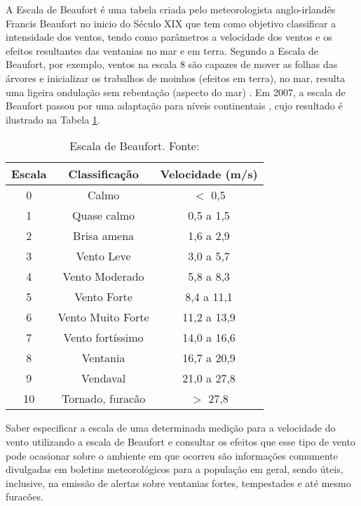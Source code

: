 A Escala de Beaufort é uma tabela criada pelo meteorologista anglo-irlandês Francis Beaufort no inicio do Século XIX que tem como objetivo classificar a intensidade dos ventos, tendo como parâmetros a velocidade dos ventos e os efeitos resultantes das ventanias no mar e em terra. Segundo a Escala de Beaufort, por exemplo, ventos na escala 8 são capazes de mover as folhas das árvores e inicializar os trabalhos de moinhos (efeitos em terra), no mar, resulta uma ligeira ondulação sem rebentação (aspecto do mar) \cite{MetOffice:Beaufort}. Em 2007, a escala de Beaufort passou por uma adaptação para níveis continentais \cite{Sentelhas:EscalaBeaufort}, cujo resultado é ilustrado na  Tabela \ref{tab:beaufort}.

\begin{table}[h!]


  \caption{Escala de Beaufort. Fonte: \cite{Sentelhas:EscalaBeaufort}} \label{tab:beaufort}
  \centering
\begin{tabular}{ccc}
 \toprule
 \textbf{Escala} & \textbf{Classificação} & \textbf{Velocidade (m/s)}\\
 \midrule
0 & Calmo & $<$ 0,5\\
1 & Quase calmo & 0,5 a 1,5\\
2 & Brisa amena & 1,6 a 2,9\\
3 & Vento Leve & 3,0 a 5,7\\
4 & Vento Moderado & 5,8 a 8,3\\
5 & Vento Forte & 8,4 a 11,1\\
6 & Vento Muito Forte &  11,2 a 13,9\\
7 & Vento fortíssimo & 14,0 a 16,6\\
8 & Ventania & 16,7 a 20,9\\
9 & Vendaval & 21,0 a 27,8\\
10 & Tornado, furacão & $>$ 27,8\\
\bottomrule
\end{tabular}
\end{table}

Saber especificar a escala de uma determinada medição para a velocidade do vento utilizando a escala de Beaufort e consultar os efeitos que esse tipo de vento pode ocasionar sobre o ambiente em que ocorreu são informações comumente divulgadas em boletins meteorológicos para a população em geral, sendo úteis, inclusive, na emissão de alertas sobre  ventanias fortes, tempestades e até mesmo furacões.

